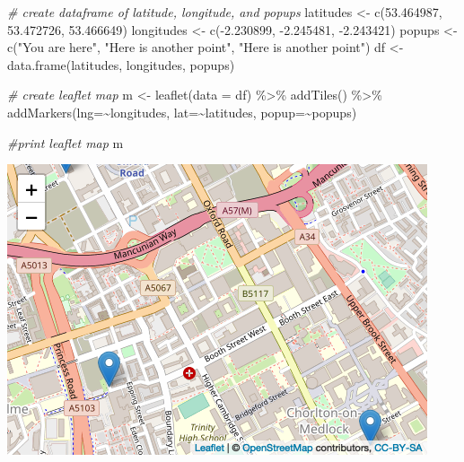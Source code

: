 \documentclass[
  krantz2]{krantz}
\makeatletter
\newenvironment{Shaded}{\begin{snugshade}}{\end{snugshade}}
\newcommand{\AttributeTok}[1]{\textcolor[rgb]{0.61,0.61,0.61}{#1}}
\newcommand{\CommentTok}[1]{\textcolor[rgb]{0.37,0.37,0.37}{\textit{#1}}}
\newcommand{\FloatTok}[1]{\textcolor[rgb]{0.06,0.06,0.06}{#1}}
\newcommand{\FunctionTok}[1]{\textcolor[rgb]{0,0,0}{#1}}
\newcommand{\NormalTok}[1]{#1}
\newcommand{\OtherTok}[1]{\textcolor[rgb]{0.37,0.37,0.37}{#1}}
\newcommand{\SpecialCharTok}[1]{\textcolor[rgb]{0,0,0}{#1}}
\newcommand{\StringTok}[1]{\textcolor[rgb]{0.5,0.5,0.5}{#1}}
\newenvironment{kframe}{%
\medskip{}
\setlength{\fboxsep}{.8em}
 \def\at@end@of@kframe{}%
 \ifinner\ifhmode%
  \def\at@end@of@kframe{\end{minipage}}%
  \begin{minipage}{\columnwidth}%
 \fi\fi%
 \def\FrameCommand##1{\hskip\@totalleftmargin \hskip-\fboxsep
 \colorbox{shadecolor}{##1}\hskip-\fboxsep
     \hskip-\linewidth \hskip-\@totalleftmargin \hskip\columnwidth}%
 \MakeFramed {\advance\hsize-\width
   \@totalleftmargin\z@ \linewidth\hsize
   \@setminipage}}%
 {\par\unskip\endMakeFramed%
 \at@end@of@kframe}
\renewenvironment{Shaded}{\begin{kframe}}{\end{kframe}}
\makeatother
\begin{document}
\begin{Shaded}
\begin{Highlighting}[]
\CommentTok{\# create dataframe of latitude, longitude, and popups}
\NormalTok{latitudes }\OtherTok{\textless{}{-}} \FunctionTok{c}\NormalTok{(}\FloatTok{53.464987}\NormalTok{, }\FloatTok{53.472726}\NormalTok{, }\FloatTok{53.466649}\NormalTok{) }
\NormalTok{longitudes }\OtherTok{\textless{}{-}} \FunctionTok{c}\NormalTok{(}\SpecialCharTok{{-}}\FloatTok{2.230899}\NormalTok{, }\SpecialCharTok{{-}}\FloatTok{2.245481}\NormalTok{, }\SpecialCharTok{{-}}\FloatTok{2.243421}\NormalTok{) }
\NormalTok{popups }\OtherTok{\textless{}{-}} \FunctionTok{c}\NormalTok{(}\StringTok{"You are here"}\NormalTok{, }\StringTok{"Here is another point"}\NormalTok{, }\StringTok{"Here is another point"}\NormalTok{) }
\NormalTok{df }\OtherTok{\textless{}{-}} \FunctionTok{data.frame}\NormalTok{(latitudes, longitudes, popups)      }

\CommentTok{\# create leaflet map}
\NormalTok{m }\OtherTok{\textless{}{-}} \FunctionTok{leaflet}\NormalTok{(}\AttributeTok{data =}\NormalTok{ df) }\SpecialCharTok{\%\textgreater{}\%} \FunctionTok{addTiles}\NormalTok{()  }\SpecialCharTok{\%\textgreater{}\%}  
  \FunctionTok{addMarkers}\NormalTok{(}\AttributeTok{lng=}\SpecialCharTok{\textasciitilde{}}\NormalTok{longitudes, }\AttributeTok{lat=}\SpecialCharTok{\textasciitilde{}}\NormalTok{latitudes, }\AttributeTok{popup=}\SpecialCharTok{\textasciitilde{}}\NormalTok{popups)}

\CommentTok{\#print leaflet map}
\NormalTok{m  }
\end{Highlighting}
\end{Shaded}

\includegraphics{crime_mapping_files/figure-latex/unnamed-chunk-50-1.png}
\end{document}
